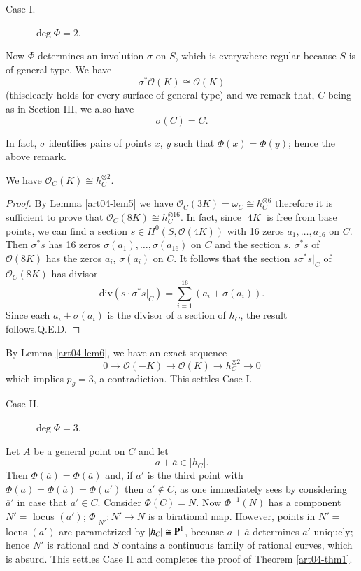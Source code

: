 \begin{description}
\item[Case I.] $\deg \Phi=2$.
\end{description}

Now $\Phi$ determines an involution $\sigma$ on $S$, which is
everywhere regular because $S$ is of general type. We have
$$
\sigma^{*}\mathscr{O}(K)\cong \mathscr{O}(K)
$$
(this\pageoriginale clearly holds for every surface of general type)
and we remark that, $C$ being as in Section III, we also have
$$
\sigma(C)=C.
$$

In fact, $\sigma$ identifies pairs of points $x$, $y$ such that
$\Phi(x)=\Phi(y)$; hence the above remark.

\begin{lem}\label{art04-lem6}
We have $\mathscr{O}_{C}(K)\cong h^{\otimes 2}_{C}$.
\end{lem}

\begin{proof}
By Lemma \ref{art04-lem5} we have $\mathscr{O}_{C}(3K)=\omega_{C}\cong
h^{\otimes 6}_{C}$ therefore it is sufficient to prove that
$\mathscr{O}_{C}(8K)\cong h^{\otimes 16}_{C}$. In fact, since $|4K|$
is free from base points, we can find a section $s\in
H^{0}(S,\mathscr{O}(4K))$ with 16 zeros $a_{1},\ldots,a_{16}$ on
$C$. Then $\sigma^{*}s$ has 16 zeros
$\sigma(a_{1}),\ldots,\sigma(a_{16})$ on $C$ and the section
$s$. $\sigma^{*}s$ of $\mathscr{O}(8K)$ has the zeros $a_{i}$,
$\sigma(a_{i})$ on $C$. It follows that the section $s\sigma^{*}
s|_{C}$ of $\mathscr{O}_{C}(8K)$ has divisor 
$$
\text{div} (s\cdot \sigma^{*}s|_{C})=\sum^{16}_{i=1}(a_{i}+\sigma(a_{i})).
$$
Since each $a_{i}+\sigma(a_{i})$ is the divisor of a section of
$h_{C}$, the result follows.\hfill Q.E.D.
\end{proof}

By Lemma \ref{art04-lem6}, we have an exact sequence
$$
0\to \mathscr{O}(-K)\to \mathscr{O}(K)\to h^{\otimes 2}_{C}\to 0
$$
which implies $p_{g}=3$, a contradiction. This settles Case I.

\begin{description}
\item[Case II.] $\deg \Phi=3$.
\end{description}

Let $A$ be a general point on $C$ and let
$$
a+\overline{a}\in |h_{C}|.
$$
Then $\Phi(\overline{a})=\Phi(\overline{a})$ and, if $a'$ is the third
point with $\Phi(a)=\Phi(\overline{a})=\Phi(a')$ then $a'\not\in C$,
as one immediately sees by considering $\overline{a}'$ in case that
$a'\in C$. Consider $\Phi(C)=N$. Now $\Phi^{-1}(N)$ has a component
$N'=$ locus $(a')$; $\Phi|_{N'}:N'\to N$ is a birational map. However,
points in $N'=$ locus $(a')$ are parametrized by
$|h_{C}|\cong \mathbf{P}^{1}$, because $a+\overline{a}$ determines $a'$
uniquely; hence $N'$ is rational and $S$ contains a continuous family
of rational curves, which is absurd. This settles Case II and
completes the proof of Theorem \ref{art04-thm1}.


